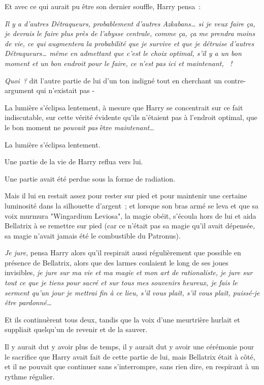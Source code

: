 Et avec ce qui aurait pu être son dernier souffle, Harry pensa~:

\emph{Il y a d'autres Détraqueurs, probablement d'autres Azkabans… si je veux faire ça, je devrais le faire plus près de l'abysse centrale, comme ça, ça me prendra moins de vie, ce qui augmentera la probabilité que je survive et que je détruise d'autres Détraqueurs… même en admettant que c'est le choix optimal, s'il y a un bon moment et un bon endroit pour le faire, ce n'est pas ici et maintenant, ~!}

\emph{Quoi~?} dit l'autre partie de lui d'un ton indigné tout en cherchant un contre-argument qui n'existait pas -

La lumière s'éclipsa lentement, à mesure que Harry se concentrait sur ce fait indiscutable, sur cette vérité évidente qu'ils n'étaient pas à l'endroit optimal, que le bon moment ne \emph{pouvait pas} être \emph{maintenant}…

La lumière s'éclipsa lentement.

Une partie de la vie de Harry reflua vers lui.

Une partie avait été perdue sous la forme de radiation.

Mais il lui en restait assez pour rester sur pied et pour maintenir une certaine luminosité dans la silhouette d'argent~; et lorsque son bras armé se leva et que sa voix murmura "Wingardium Leviosa", la magie obéit, s'écoula hors de lui et aida Bellatrix à se remettre sur pied (car ce n'était pas sa magie qu'il avait dépensée, sa magie n'avait jamais été le combustible du Patronus).

\emph{Je jure}, pensa Harry alors qu'il respirait aussi régulièrement que possible en présence de Bellatrix, alors que des larmes coulaient le long de ses joues invisibles, \emph{je jure sur ma vie et ma magie et mon art de rationaliste, je jure sur tout ce que je tiens pour sacré et sur tous mes souvenirs heureux, je fais le serment qu'un jour je mettrai fin à ce lieu, s'il vous plaît, s'il vous plaît, puissé-je être pardonné…}

Et ils continuèrent tous deux, tandis que la voix d'une meurtrière hurlait et suppliait quelqu'un de revenir et de la sauver.

Il y aurait dut y avoir plus de temps, il y aurait dut y avoir une cérémonie pour le sacrifice que Harry avait fait de cette partie de lui, mais Bellatrix était à côté, et il ne pouvait que continuer sans s'interrompre, sans rien dire, en respirant à un rythme régulier.

